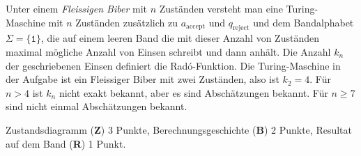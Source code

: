 \begin{diskussion}
Unter einem {\em Fleissigen Biber} mit $n$ Zuständen versteht
man eine Turing-Maschine mit $n$ Zuständen zusätzlich zu $a_{\text{accept}}$
und $q_{\text{reject}}$ und dem Bandalphabet $\Sigma=\{\texttt{1}\}$,
die auf einem leeren Band die mit dieser Anzahl von Zuständen maximal
mögliche Anzahl von Einsen schreibt und dann anhält.
Die Anzahl $k_n$ der geschriebenen Einsen definiert die Rad\'o-Funktion.
Die Turing-Maschine in der Aufgabe ist ein Fleissiger Biber mit zwei Zuständen,
also ist $k_2=4$.
Für $n>4$ ist $k_n$ nicht exakt bekannt, aber es sind Abschätzungen bekannt.
Für $n\ge 7$ sind nicht einmal Abschätzungen bekannt.
\end{diskussion}

\begin{bewertung}
Zustandsdiagramm ({\bf Z}) 3 Punkte,
Berechnungsgeschichte ({\bf B}) 2 Punkte,
Resultat auf dem Band ({\bf R}) 1 Punkt.
\end{bewertung}

